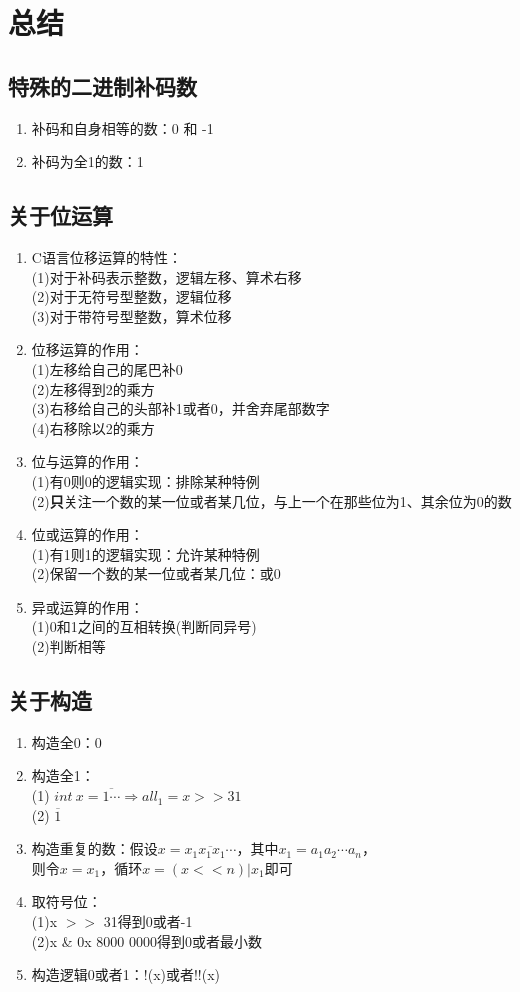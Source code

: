 \documentclass[12pt, a4paper, oneside]{ctexart}
\begin{document}
\section{总结}
\subsection{特殊的二进制补码数}
\begin{enumerate}
    \item 补码和自身相等的数：0 和 -1
    \item 补码为全1的数：1
\end{enumerate}
\subsection{关于位运算}
\begin{enumerate}
    \item C语言位移运算的特性：\\(1)对于补码表示整数，逻辑左移、算术右移 \\(2)对于无符号型整数，逻辑位移 \\(3)对于带符号型整数，算术位移
    \item 位移运算的作用：\\(1)左移给自己的尾巴补0 \\(2)左移得到2的乘方 \\(3)右移给自己的头部补1或者0，并舍弃尾部数字 \\(4)右移除以2的乘方
    \item 位与运算的作用：\\(1)有0则0的逻辑实现：排除某种特例 \\(2)\textbf{只}关注一个数的某一位或者某几位，与上一个在那些位为1、其余位为0的数
    \item 位或运算的作用：\\(1)有1则1的逻辑实现：允许某种特例 \\(2)保留一个数的某一位或者某几位：或0
    \item 异或运算的作用：\\(1)0和1之间的互相转换(判断同异号) \\(2)判断相等
\end{enumerate}
\subsection{关于构造}
\begin{enumerate}
    \item 构造全0：0
    \item 构造全1：\\(1) $int \ x=\overline{1\cdots} \Rightarrow all_1 = x >> 31$\\(2) $\overline{1}$
    \item 构造重复的数：假设$x=\overline{x_1 x_1 x_1 \cdots}$，其中$x_1=a_1a_2\cdots a_n$，\\则令$x=x_1$，循环$x=(x<<n) | x_1$即可
    \item 取符号位：\\(1)x $>>$ 31得到0或者-1 \\(2)x \& 0x 8000 0000得到0或者最小数
    \item 构造逻辑0或者1：!(x)或者!!(x)
\end{enumerate}
\end{document}
